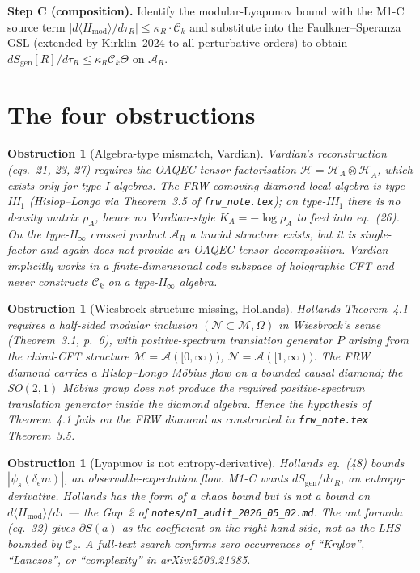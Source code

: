 \documentclass[11pt]{article}
\newtheorem{obstruction}[theorem]{Obstruction}
\theoremstyle{remark}
\newcommand{\Ck}{\mathcal{C}_{k}}
\newcommand{\tauR}{\tau_{R}}
\newcommand{\kR}{\kappa_{R}}
\newcommand{\Sgen}{S_{\mathrm{gen}}}
\newcommand{\AR}{\mathcal{A}_R}
\newcommand{\AA}{\mathcal{A}}
\newcommand{\HH}{\mathcal{H}}
\begin{document}
\textbf{Step C (composition).} Identify the modular-Lyapunov bound with the
M1-C source term $|d\langle H_{\mathrm{mod}}\rangle/d\tauR| \le \kR \cdot \Ck$
and substitute into the Faulkner--Speranza GSL (extended by Kirklin~2024 to
all perturbative orders) to obtain
$d\Sgen[R]/d\tauR \le \kR \Ck \Theta$ on $\AR$.

\section{The four obstructions}

\begin{obstruction}[Algebra-type mismatch, Vardian]\label{obs:O1}
Vardian's reconstruction (eqs.~21, 23, 27) requires the OAQEC tensor
factorisation $\HH = \HH_A \otimes \HH_{\bar A}$, which exists only for
type-I algebras. The FRW comoving-diamond local algebra is type III$_1$
(Hislop--Longo via Theorem~3.5 of \texttt{frw\_note.tex}); on type-III$_1$
there is no density matrix $\rho_A$, hence no Vardian-style
$K_A = -\log \rho_A$ to feed into eq.~(26). On the type-II$_\infty$
crossed product $\AR$ a tracial structure exists, but it is single-factor
and again does not provide an OAQEC tensor decomposition. Vardian
implicitly works in a finite-dimensional code subspace of holographic
CFT and never constructs $\Ck$ on a type-II$_\infty$ algebra.
\end{obstruction}

\begin{obstruction}[Wiesbrock structure missing, Hollands]\label{obs:O2}
Hollands Theorem~4.1 requires a half-sided modular inclusion
$(\mathcal{N} \subset \mathcal{M}, \Omega)$ in Wiesbrock's sense
(Theorem~3.1, p.~6), with positive-spectrum translation generator $P$
arising from the chiral-CFT structure $\mathcal{M} = \AA([0,\infty))$,
$\mathcal{N} = \AA([1,\infty))$. The FRW diamond carries a Hislop--Longo
Möbius flow on a \emph{bounded} causal diamond; the SO$(2,1)$ Möbius
group does not produce the required positive-spectrum translation
generator inside the diamond algebra. Hence the hypothesis of
Theorem~4.1 fails on the FRW diamond as constructed in
\texttt{frw\_note.tex} Theorem~3.5.
\end{obstruction}

\begin{obstruction}[Lyapunov is not entropy-derivative]\label{obs:O3}
Hollands eq.~(48) bounds $|\psi_s(\delta_\epsilon m)|$, an
\emph{observable-expectation flow}. M1-C wants
$d\Sgen / d\tauR$, an \emph{entropy-derivative}. Hollands has the
\emph{form} of a chaos bound but is not a bound on
$d\langle H_{\mathrm{mod}}\rangle/d\tau$ --- the Gap~2 of
\texttt{notes/m1\_audit\_2026\_05\_02.md}. The ant formula (eq.~32) gives
$\partial S(a)$ as the \emph{coefficient} on the right-hand side, not as
the LHS bounded by $\Ck$. A full-text search confirms zero occurrences of
``Krylov'', ``Lanczos'', or ``complexity'' in arXiv:2503.21385.
\end{obstruction}
\end{document}
